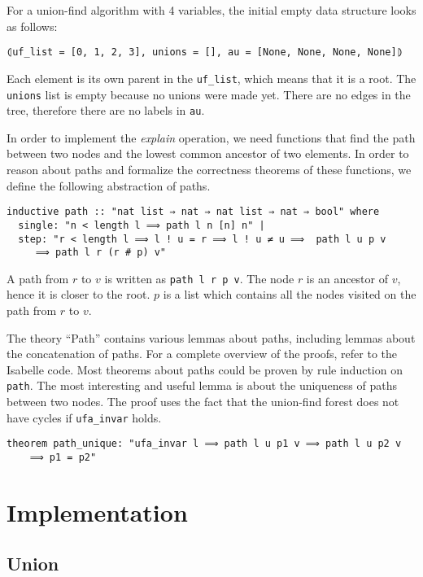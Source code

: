 \begin{exmp}\label{empty_ufe}
For a union-find algorithm with 4 variables, the initial empty data structure looks as follows:
\begin{lstlisting}
⦇uf_list = [0, 1, 2, 3], unions = [], au = [None, None, None, None]⦈
\end{lstlisting}
Each element is its own parent in the \lstinline{uf_list}, which means that it is a root. The \lstinline{unions} list is empty because no unions were made yet.
There are no edges in the tree, therefore there are no labels in \lstinline{au}.
\end{exmp}

In order to implement the \emph{explain} operation, we need functions that find the path between two nodes and the lowest common ancestor of two elements.
In order to reason about paths and formalize the correctness theorems of these functions, we define the following abstraction of paths.

\begin{lstlisting}
inductive path :: "nat list ⇒ nat ⇒ nat list ⇒ nat ⇒ bool" where
  single: "n < length l ⟹ path l n [n] n" |
  step: "r < length l ⟹ l ! u = r ⟹ l ! u ≠ u ⟹  path l u p v
     ⟹ path l r (r # p) v"
\end{lstlisting}

A path from $r$ to $v$ is written as \lstinline{path l r p v}. The node $r$ is an ancestor of $v$, hence it is closer to the root. $p$ is a list which contains all the nodes visited on the path from $r$ to $v$.

The theory ``Path'' contains various lemmas about paths, including lemmas about the concatenation of paths.
For a complete overview of the proofs, refer to the Isabelle code.
Most theorems about paths could be proven by rule induction on \lstinline{path}.
The most interesting and useful lemma is about the uniqueness of paths between two nodes. The proof uses the fact that the union-find forest does not have cycles if \lstinline|ufa_invar| holds.

\begin{lstlisting}
theorem path_unique: "ufa_invar l ⟹ path l u p1 v ⟹ path l u p2 v
    ⟹ p1 = p2"
\end{lstlisting}


\section{Implementation}

\subsection{Union}

